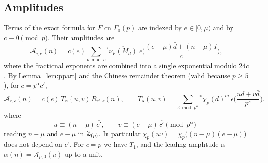 \documentclass[11pt]{amsart}
\theoremstyle{definition}\newtheorem{definition}[theorem]{Definition}
\theoremstyle{remark}\newtheorem{remark}[theorem]{Remark}
\newcommand{\cA}{\mathcal A}\newcommand{\cK}{\mathcal K}\newcommand{\Gz}{\Gamma_0}
\begin{document}
\subsection{Amplitudes}
Terms of the exact formula for $F$ on $\Gz(p)$ are indexed by $e\in[0,\mu)$ and by $c\equiv0\pmod p$. Their amplitudes are
\begin{equation}\label{eq:Kp}
\cA_{c,e}(n)=c(e)\sum_{d\bmod c}{}^{*}\overline{\nu_F(M_d)}\;e\Big(\frac{(e-\mu)\bar d+(n-\mu)d}{c}\Big),
\end{equation}
where the fractional exponents are combined into a single exponential modulo $24c$. By Lemma~\ref{lem:ppart} and the Chinese remainder theorem (valid because $p\ge5$), for $c=p^\alpha c'$,
\begin{equation}\label{eq:factor}
\cA_{c,e}(n)=c(e)\,T_\alpha(u,v)\,R_{c',e}(n),\qquad T_\alpha(u,v)=\sum_{d\bmod p^\alpha}{}^{*}\chi_p(d)^m\,e\Big(\frac{ud+v\bar d}{p^\alpha}\Big),
\end{equation}
where
\[
u\equiv(n-\mu)\,\overline{c'},\qquad v\equiv(e-\mu)\,\overline{c'}\pmod{p^\alpha},
\]
reading $n-\mu$ and $e-\mu$ in $\mathbb Z_{(p)}$. In particular $\chi_p(uv)=\chi_p\big((n-\mu)(e-\mu)\big)$ does not depend on $c'$. For $c=p$ we have $T_1$, and the leading amplitude is $\alpha(n)=\cA_{p,0}(n)$ up to a unit.
\end{document}
